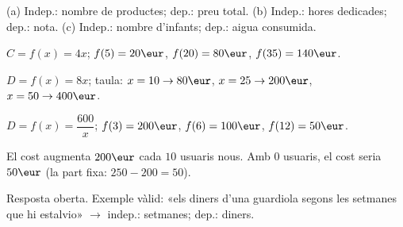 \begin{solucions}
\begin{sollist}
  \item (a) Indep.: nombre de productes; dep.: preu total. \quad
        (b) Indep.: hores dedicades; dep.: nota. \quad
        (c) Indep.: nombre d'infants; dep.: aigua consumida.
  \item $C=f(x)=4x$; \quad $f(5)=20\eur$, \quad $f(20)=80\eur$, \quad $f(35)=140\eur$.
  \item $D=f(x)=8x$; \quad taula: $x=10\rightarrow 80\eur$, \quad
        $x=25\rightarrow 200\eur$, \quad $x=50\rightarrow 400\eur$.
  \item $D=f(x)=\dfrac{\num{600}}{x}$; \quad $f(3)=200\eur$, \quad
        $f(6)=100\eur$, \quad $f(12)=50\eur$.
  \item El cost augmenta $200\eur$ cada $10$ usuaris nous. Amb $0$ usuaris, el cost
        seria $50\eur$ (la part fixa: $250-200=50$).
  \item Resposta oberta. Exemple vàlid: «els diners d'una guardiola segons les
        setmanes que hi estalvio» $\rightarrow$ indep.: setmanes; dep.: diners.
\end{sollist}
\end{solucions}

